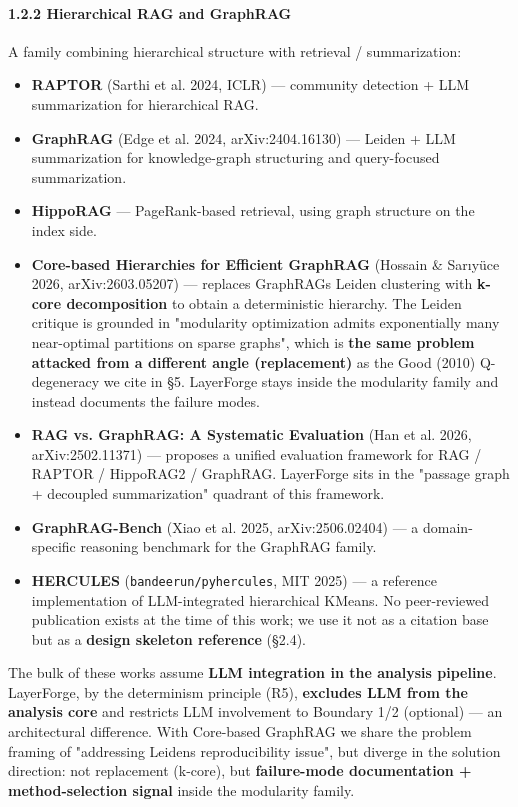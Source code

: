 \documentclass[
]{article}
\providecommand{\tightlist}{%
  \setlength{\itemsep}{0pt}\setlength{\parskip}{0pt}}
\begin{document}
\paragraph{1.2.2 Hierarchical RAG and
GraphRAG}\label{122-hierarchical-rag-and-graphrag}

A family combining hierarchical structure with retrieval /
summarization:

\begin{itemize}
\tightlist
\item
  \textbf{RAPTOR} (Sarthi et al. 2024, ICLR) --- community detection +
  LLM summarization for hierarchical RAG.
\item
  \textbf{GraphRAG} (Edge et al. 2024, arXiv:2404.16130) --- Leiden +
  LLM summarization for knowledge-graph structuring and query-focused
  summarization.
\item
  \textbf{HippoRAG} --- PageRank-based retrieval, using graph structure
  on the index side.
\item
  \textbf{Core-based Hierarchies for Efficient GraphRAG} (Hossain \&
  Sarıyüce 2026, arXiv:2603.05207) --- replaces
  GraphRAG\textquotesingle s Leiden clustering with \textbf{k-core
  decomposition} to obtain a deterministic hierarchy. The Leiden
  critique is grounded in "modularity optimization admits exponentially
  many near-optimal partitions on sparse graphs", which is \textbf{the
  same problem attacked from a different angle (replacement)} as the
  Good (2010) Q-degeneracy we cite in §5. LayerForge stays inside the
  modularity family and instead documents the failure modes.
\item
  \textbf{RAG vs. GraphRAG: A Systematic Evaluation} (Han et al. 2026,
  arXiv:2502.11371) --- proposes a unified evaluation framework for RAG
  / RAPTOR / HippoRAG2 / GraphRAG. LayerForge sits in the "passage graph
  + decoupled summarization" quadrant of this framework.
\item
  \textbf{GraphRAG-Bench} (Xiao et al. 2025, arXiv:2506.02404) --- a
  domain-specific reasoning benchmark for the GraphRAG family.
\item
  \textbf{HERCULES} (\texttt{bandeerun/pyhercules}, MIT 2025) --- a
  reference implementation of LLM-integrated hierarchical KMeans. No
  peer-reviewed publication exists at the time of this work; we use it
  not as a citation base but as a \textbf{design skeleton reference}
  (§2.4).
\end{itemize}

The bulk of these works assume \textbf{LLM integration in the analysis
pipeline}. LayerForge, by the determinism principle (R5),
\textbf{excludes LLM from the analysis core} and restricts LLM
involvement to Boundary 1/2 (optional) --- an architectural difference.
With Core-based GraphRAG we share the problem framing of "addressing
Leiden\textquotesingle s reproducibility issue", but diverge in the
solution direction: not replacement (k-core), but \textbf{failure-mode
documentation + method-selection signal} inside the modularity family.
\end{document}
